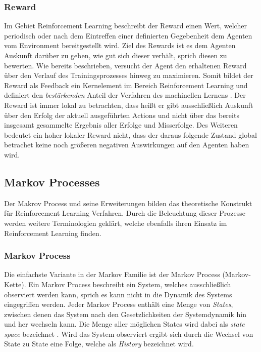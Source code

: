 \documentclass[11pt]{scrartcl}
\begin{document}
\subsubsection{Reward}
Im Gebiet Reinforcement Learning beschreibt der Reward einen Wert, welcher periodisch oder nach
dem Eintreffen einer definierten Gegebenheit dem Agenten vom Environment bereitgestellt wird.
Ziel des Rewards ist es dem Agenten Auskunft darüber zu geben, wie gut sich dieser verhält, sprich
diesen zu bewerten. Wie bereits beschrieben, versucht der Agent den erhaltenen Reward über den
Verlauf des Trainingsprozesses hinweg zu maximieren. Somit bildet der Reward als Feedback ein
Kernelement im Bereich Reinforcement Learning und definiert den \textit{bestärkenden} Anteil der 
Verfahren des machinellen Lernens \cite[~S.6 f.]{L2018}. Der Reward ist immer lokal zu betrachten,
dass heißt er gibt ausschließlich Auskunft über den Erfolg der aktuell ausgeführten Actions und
nicht über das bereits insgesamt gesammelte Ergebnis aller Erfolge und Misserfolge. Des Weiteren
bedeutet ein hoher lokaler Reward nicht, dass der daraus folgende Zustand global betrachet keine
noch größeren negativen Auswirkungen auf den Agenten haben wird.


\subsection{Markov Processes}
Der Makrov Process und seine Erweiterungen bilden das theoretische Konstrukt für Reinforcement Learning
Verfahren. Durch die Beleuchtung dieser Prozesse werden weitere Terminologien geklärt, welche ebenfalls
ihren Einsatz im Reinforcement Learning finden.


\subsubsection{Markov Process}
Die einfachste Variante in der Markov Familie ist der Markov Process (Markov-Kette). Ein Markov Process
beschreibt ein System, welches ausschließlich observiert werden kann, sprich es kann nicht in die Dynamik
des Systems eingegriffen werden. Jeder Markov Process enthält eine Menge von \textit{States}, zwischen
denen das System nach den Gesetzlichkeiten der Systemdynamik hin und her wechseln kann. Die Menge aller
möglichen States wird dabei als \textit{state space} bezeichnet \cite[~S.12]{L2018}. Wird das System
observiert ergibt sich durch die Wechsel von State zu State eine Folge, welche als \textit{History}
bezeichnet wird. 
\end{document}
